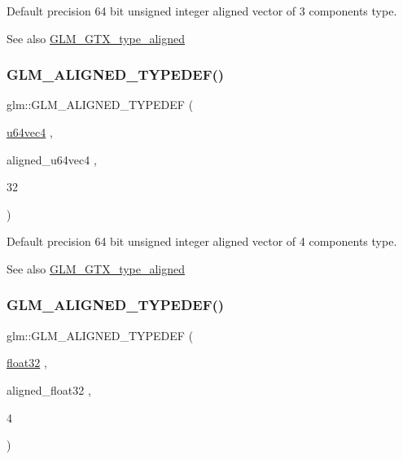 Default precision 64 bit unsigned integer aligned vector of 3 components type. \begin{DoxySeeAlso}{See also}
\mbox{\hyperlink{group__gtx__type__aligned}{G\+L\+M\+\_\+\+G\+T\+X\+\_\+type\+\_\+aligned}} 
\end{DoxySeeAlso}
\mbox{\label{group__gtx__type__aligned_ga53a8a03dca2015baec4584f45b8e9cdc}} 
\subsubsection{\texorpdfstring{GLM\_ALIGNED\_TYPEDEF()}{GLM\_ALIGNED\_TYPEDEF()}\hspace{0.1cm}{\footnotesize\ttfamily [136/209]}}
{\footnotesize\ttfamily glm\+::\+G\+L\+M\+\_\+\+A\+L\+I\+G\+N\+E\+D\+\_\+\+T\+Y\+P\+E\+D\+EF (\begin{DoxyParamCaption}\item[{\mbox{\hyperlink{group__gtc__type__precision_gadafdefd5524bf6a48bb7c47edb787ae5}{u64vec4}}}]{,  }\item[{aligned\+\_\+u64vec4}]{,  }\item[{32}]{ }\end{DoxyParamCaption})}

Default precision 64 bit unsigned integer aligned vector of 4 components type. \begin{DoxySeeAlso}{See also}
\mbox{\hyperlink{group__gtx__type__aligned}{G\+L\+M\+\_\+\+G\+T\+X\+\_\+type\+\_\+aligned}} 
\end{DoxySeeAlso}
\mbox{\label{group__gtx__type__aligned_gab3301bae94ef5bf59fbdd9a24e7d2a01}} 
\subsubsection{\texorpdfstring{GLM\_ALIGNED\_TYPEDEF()}{GLM\_ALIGNED\_TYPEDEF()}\hspace{0.1cm}{\footnotesize\ttfamily [137/209]}}
{\footnotesize\ttfamily glm\+::\+G\+L\+M\+\_\+\+A\+L\+I\+G\+N\+E\+D\+\_\+\+T\+Y\+P\+E\+D\+EF (\begin{DoxyParamCaption}\item[{\mbox{\hyperlink{group__gtc__type__precision_ga814f2f65354b6588b067cc5c67a6b340}{float32}}}]{,  }\item[{aligned\+\_\+float32}]{,  }\item[{4}]{ }\end{DoxyParamCaption})}

